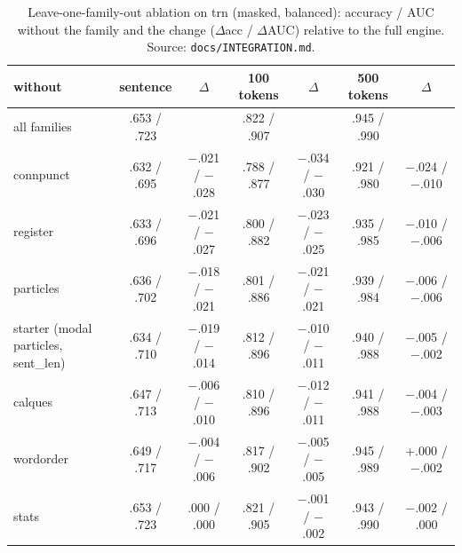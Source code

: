 \begin{table}[tbp]
\centering\footnotesize
\caption{Leave-one-family-out ablation on trn (masked, balanced): accuracy / AUC without the family
and the change ($\Delta$acc / $\Delta$AUC) relative to the full engine. Source: \texttt{docs/INTEGRATION.md}.}
\label{tab-ablation}
\begin{tabular}{@{}l c c c c c c@{}}
\toprule
without & sentence & $\Delta$ & 100 tokens & $\Delta$ & 500 tokens & $\Delta$ \\
\midrule
all families & .653 / .723 &  & .822 / .907 &  & .945 / .990 &  \\
\midrule
connpunct & .632 / .695 & $-$.021 / $-$.028 & .788 / .877 & $-$.034 / $-$.030 & .921 / .980 & $-$.024 / $-$.010 \\
register & .633 / .696 & $-$.021 / $-$.027 & .800 / .882 & $-$.023 / $-$.025 & .935 / .985 & $-$.010 / $-$.006 \\
particles & .636 / .702 & $-$.018 / $-$.021 & .801 / .886 & $-$.021 / $-$.021 & .939 / .984 & $-$.006 / $-$.006 \\
starter (modal particles, sent\_len) & .634 / .710 & $-$.019 / $-$.014 & .812 / .896 & $-$.010 / $-$.011 & .940 / .988 & $-$.005 / $-$.002 \\
calques & .647 / .713 & $-$.006 / $-$.010 & .810 / .896 & $-$.012 / $-$.011 & .941 / .988 & $-$.004 / $-$.003 \\
wordorder & .649 / .717 & $-$.004 / $-$.006 & .817 / .902 & $-$.005 / $-$.005 & .945 / .989 & +.000 / $-$.002 \\
stats & .653 / .723 & .000 / .000 & .821 / .905 & $-$.001 / $-$.002 & .943 / .990 & $-$.002 / .000 \\
\bottomrule
\end{tabular}
\end{table}
